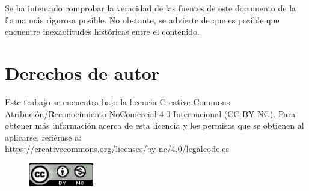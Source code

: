 \documentclass[12pt]{book}
\begin{document}
Se ha intentado comprobar la veracidad de las fuentes de este documento de la forma más rigurosa posible. No obstante, se advierte de que es posible que encuentre inexactitudes históricas entre el contenido.

\section{Derechos de autor}

Este trabajo se encuentra bajo la licencia Creative Commons Atribución/Reconocimiento-NoComercial 4.0 Internacional (CC BY-NC). Para obtener más información acerca de esta licencia y los permisos que se obtienen al aplicarse, refiérase a:\\
https://creativecommons.org/licenses/by-nc/4.0/legalcode.es
\begin{figure}[h]
	\centering
	\includegraphics[height=1cm]{cc-by-nc}
\end{figure}
\end{document}
